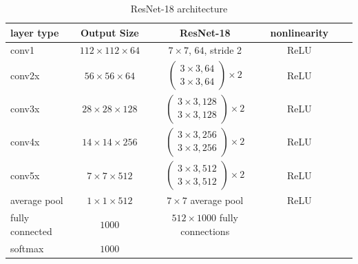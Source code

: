\documentclass[11pt]{article}
\theoremstyle{t}
\begin{document}
\begin{table}[H]
\begin{center}
    \label{table:resnet}
\begin{tabular}{ l c c c c r}
  \hline
  layer type & Output Size & ResNet-18&  nonlinearity \\
  \hline
\textrm{conv1} & $112 \times 112 \times 64$ & $7 \times 7$, $64$, stride 2 & ReLU \\
\textrm{conv2x} & $ 56 \times 56 \times 64$ &$ \begin{pmatrix}
   3 \times 3, 64 \\
   3 \times 3, 64
\end{pmatrix} \times 2$& ReLU \\
\textrm{conv3x} & $ 28 \times 28 \times 128 $& $ \begin{pmatrix}
   3 \times 3, 128 \\
   3 \times 3, 128
\end{pmatrix} \times 2$ & ReLU \\
\textrm{conv4x} & $ 14 \times 14 \times 256$ &$ \begin{pmatrix}
   3 \times 3, 256 \\
   3 \times 3, 256
\end{pmatrix} \times 2$& ReLU \\
\textrm{conv5x} & $ 7 \times 7 \times 512$ &$ \begin{pmatrix}
   3 \times 3, 512 \\
   3 \times 3, 512
\end{pmatrix} \times 2$& ReLU \\
\textrm{average pool} & $ 1 \times 1 \times 512$ & $7 \times 7$ average pool & ReLU \\
\textrm{fully connected} & $1000$ & $512 \times 1000$ fully connections &  \\
\textrm{softmax} & $1000$ &  & \\
  \hline
\end{tabular}
    \caption{ResNet-18 architecture}
\end{center}
\end{table}
\end{document}
